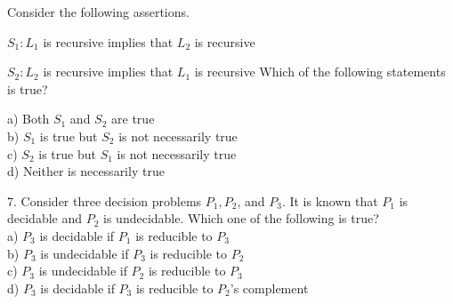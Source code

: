 \documentclass[8pt]{beamer}
\begin{document}
\begin{frame}
\hspace*{0.5cm} Consider the following assertions.\\
\vspace*{0.1cm}

\hspace*{0.5cm} $S _{1}: L _{1}$ is recursive implies that $L _{2}$ is recursive\\
\vspace*{0.1cm}

\hspace*{0.5cm} $S _{2}: L _{2}$ is recursive implies that $L _{1}$ is recursive
Which of the following statements is true?\\
\vspace*{0.1cm}

\hspace*{0.5cm} a) Both $S _{1}$ and $S _{2}$ are true\\
\hspace*{0.5cm} b) $S _{1}$ is true but $S _{2}$ is not necessarily true\\
\hspace*{0.5cm} c) $S _{2}$ is true but $S _{1}$ is not necessarily true\\
\hspace*{0.5cm} d) Neither is necessarily true\\
\vspace*{0.2cm}

\hspace*{-0.4cm}
7. Consider three decision problems $P _{1},P _{2}$, and $P _{3}$. It is known that $P _{1}$ is decidable and $P _{2}$ is undecidable.
Which one of the following is true?\\
\hspace*{0.5cm} a) $P _{3}$ is decidable if $P _{1}$ is reducible to $P _{3}$ \\
\hspace*{0.5cm} b) $P _{3}$ is undecidable if $P _{3}$ is reducible to $P _{2}$ \\
\hspace*{0.5cm} c) $P _{3}$ is undecidable if $P _{2}$ is reducible to $P _{3}$ \\
\hspace*{0.5cm} d) $P _{3}$ is decidable if $P _{3}$ is reducible to $P _{2}$’s complement\\
\vspace*{0.2cm}

\end{frame}
\end{document}
